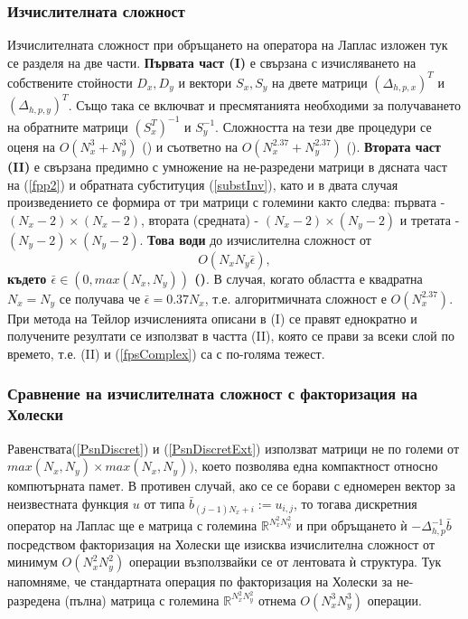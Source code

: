 \documentclass[a4paper]{article}
\newcommand{\be}{\begin{equation}}
\newcommand{\ee}{\end{equation}}
\newcommand{\rf}[1]{(\ref{#1})}
\newcommand{\RR}{\mathbb{R}}
\theoremstyle{remark}
\begin{document}
\subsubsection{Изчислителната сложност}
Изчислителната сложност при обръщането на оператора на Лаплас изложен тук се разделя на две части. \textbf{ Първата част (I)} е свързана с изчисляването на собствените стойности $D_x, D_y$ и вектори $S_x, S_y$ на двете матрици $(\Delta_{h,p,x})^T$ и $(\Delta_{h,p,y})^T$. Също така се включват и пресмятанията необходими за получаването на обратните матрици $(S_x^T)^{-1}$ и $S_y^{-1}$. Сложността на тези две процедури се оценя на $O(N_x^3+N_y^3)$ (\cite{ref260}) и съответно на $O(N_x^{2.37}+N_y^{2.37})$ (\cite{ref27}). \textbf{Втората част (II)} е свързана предимно с умножение на не-разредени матрици в дясната част на \rf{fpp2} и обратната субституция \rf{substInv}, като и в двата случая произведението се формира от три матрици  с големини както следва: първата - $(N_x-2) \times (N_x-2)$, втората (средната) - $(N_x-2) \times (N_y-2)$ и третата - $(N_y-2) \times (N_y-2)$. \textbf{Това води} до изчислителна сложност от 
\be\label{fpsComplex}
O(N_x N_y \bar{\epsilon}),
\ee
\textbf{където $\bar{\epsilon} \in (0, max(N_x, N_y))$ (\cite{ref26, ref27})}. В случая, когато областта е квадратна $N_x = N_y$ се получава че $\bar{\epsilon} = 0.37 N_x$, т.е. алгоритмичната сложност е $O(N_x^{2.37})$. При метода на Тейлор изчисленията описани в (I) се правят еднократно и получените резултати се използват в частта (II), която се прави за всеки слой по времето, т.е. (II) и \rf{fpsComplex} са с по-голяма тежест. 

\subsubsection{Сравнение на изчислителната сложност с факторизация на Холески}
Равенствата\rf{PsnDiscret} и \rf{PsnDiscretExt} използват матрици не по големи от $max(N_x, N_y) \times max(N_x, N_y))$, което позволява една компактност относно компютърната памет. В противен случай, ако се се борави с едномерен вектор за неизвестната функция $u$ от типа $\bar {b}_{(j-1)N_x + i} := u_{i,j}$, то тогава дискретния оператор на Лаплас ще е матрица с големина $\RR^{N_x^2 N_y^2}$ и при обръщането ѝ $-\Delta_{h,p}^{-1}\bar {b}$ посредством факторизация на Холески ще изисква изчислителна сложност от минимум $O(N_x^2 N_y^2)$ операции възползвайки се от лентовата ѝ структура. Тук напомняме, че стандартната операция по факторизация на Холески за не-разредена (пълна) матрица с големина $\RR^{N_x^2 N_y^2}$ отнема $O(N_x^3 N_y^3)$ операции.
\end{document}
